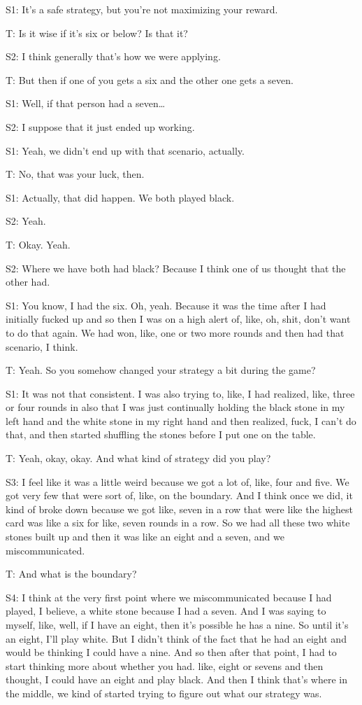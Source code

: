 S1: It's a safe strategy, but you're not maximizing your reward.

T: Is it wise if it's six or below? Is that it?

S2: I think generally that’s how we were applying. 

T: But then if one of you gets a six and the other one gets a seven. 

S1: Well, if that person had a seven…

S2: I suppose that it just ended up working.

S1: Yeah, we didn't end up with that scenario, actually. 

T: No, that was your luck, then. 

S1: Actually, that did happen. We both played black. 

S2: Yeah. 

T: Okay. Yeah. 

S2: Where we have both had black? Because I think one of us thought that the other had.

S1: You know, I had the six. Oh, yeah. Because it was the time after I had initially fucked up and so then I was on a high alert of, like, oh, shit, don't want to do that again. We had won, like, one or two more rounds and then had that scenario, I think. 

T: Yeah. So you somehow changed your strategy a bit during the game?

S1: It was not that consistent. I was also trying to, like, I had realized, like, three or four rounds in also that I was just continually holding the black stone in my left hand and the white stone in my right hand and then realized, fuck, I can't do that, and then started shuffling the stones before I put one on the table.

T: Yeah, okay, okay. And what kind of strategy did you play? 

S3: I feel like it was a little weird because we got a lot of, like, four and five. We got very few that were sort of, like, on the boundary. And I think once we did, it kind of broke down because we got like, seven in a row that were like the highest card was like a six for like, seven rounds in a row. So we had all these two white stones built up and then it was like an eight and a seven, and we miscommunicated. 

T: And what is the boundary? 

S4: I think at the very first point where we miscommunicated because I had played, I believe, a white stone because I had a seven. And I was saying to myself, like, well, if I have an eight, then it's possible he has a nine. So until it's an eight, I'll play white. But I didn't think of the fact that he had an eight and would be thinking I could have a nine. And so then after that point, I had to start thinking more about whether you had. like, eight or sevens and then thought, I could have an eight and play black. And then I think that's where in the middle, we kind of started trying to figure out what our strategy was. 

